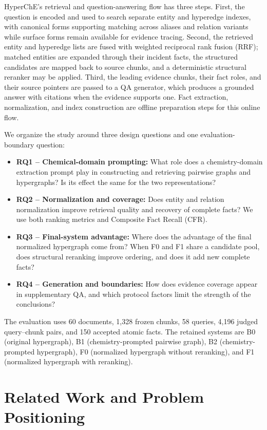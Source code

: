 HyperChE's retrieval and question-answering flow has three steps. First, the question is encoded and used to search separate entity and hyperedge indexes, with canonical forms supporting matching across aliases and relation variants while surface forms remain available for evidence tracing. Second, the retrieved entity and hyperedge lists are fused with weighted reciprocal rank fusion (RRF); matched entities are expanded through their incident facts, the structured candidates are mapped back to source chunks, and a deterministic structural reranker may be applied. Third, the leading evidence chunks, their fact roles, and their source pointers are passed to a QA generator, which produces a grounded answer with citations when the evidence supports one. Fact extraction, normalization, and index construction are offline preparation steps for this online flow.

We organize the study around three design questions and one evaluation-boundary question:

\begin{itemize}
\item \textbf{RQ1 -- Chemical-domain prompting:} What role does a chemistry-domain extraction prompt play in constructing and retrieving pairwise graphs and hypergraphs? Is its effect the same for the two representations?
\item \textbf{RQ2 -- Normalization and coverage:} Does entity and relation normalization improve retrieval quality and recovery of complete facts? We use both ranking metrics and Composite Fact Recall (CFR).
\item \textbf{RQ3 -- Final-system advantage:} Where does the advantage of the final normalized hypergraph come from? When F0 and F1 share a candidate pool, does structural reranking improve ordering, and does it add new complete facts?
\item \textbf{RQ4 -- Generation and boundaries:} How does evidence coverage appear in supplementary QA, and which protocol factors limit the strength of the conclusions?
\end{itemize}

The evaluation uses 60 documents, 1,328 frozen chunks, 58 queries, 4,196 judged query--chunk pairs, and 150 accepted atomic facts. The retained systems are B0 (original hypergraph), B1 (chemistry-prompted pairwise graph), B2 (chemistry-prompted hypergraph), F0 (normalized hypergraph without reranking), and F1 (normalized hypergraph with reranking).

\section{Related Work and Problem Positioning}

